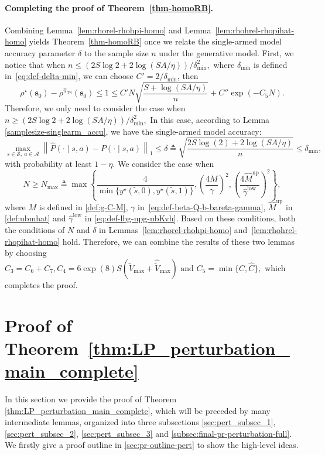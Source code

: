 \documentclass[mnsc,nonblindrev]{informs3}
\newcommand{\lbgmhat}{\widehat{\gamma}^{\mathrm{low}}}
\newcommand{\ubmhat}{\widehat{M}^{\mathrm{up}}}
\newcommand{\pihts}{\widehat{\pi}_{\mathrm{TS}}}
\newcommand{\bms}{\bm{s}}
\begin{document}
\paragraph{Completing the proof of Theorem~\ref{thm-homoRB}.}
Combining Lemma~\ref{lem:rhorel-rhohpi-homo} and Lemma~\ref{lem:rhohrel-rhopihat-homo} yields Theorem~\ref{thm-homoRB} once we relate the single-armed model accuracy parameter $\delta$ to the sample size $n$ under the generative model.
First, we notice that when
$n\le\left(2S\log2+2\log(SA/\eta)\right)/\delta_{\min}^2,
$
where $\delta_{\min}$ is defined in~\eqref{eq:def-delta-min}, we can choose $C'=2/\delta_{\min}$, then 
\[
    \rho^\star(\bms_0)-\rho^{\pihts}(\bms_0)\le 1\le C'N\sqrt{\frac{S + \log (SA/\eta)}{n}}+C''\exp(-C_5N).
\]
Therefore, we only need to consider the case when
$
n\ge\left(2S\log2+2\log(SA/\eta)\right)/\delta_{\min}^2,
$
In this case, according to Lemma \ref{samplesize-singlearm_accu}, we have the single-armed model accuracy:
\[
    \max_{s \in \mathcal{S},\ a \in \mathcal{A}} \left\| \widehat{P}(\cdot \mid s, a) - P(\cdot \mid s, a) \right\|_1 \le \delta\triangleq \sqrt{\frac{2S \log(2) + 2\log (SA/\eta)}{n}}\le\delta_{\min},
\]
with probability at least $1-\eta$. We consider the case when
\begin{equation}\label{eq:def-Nmax}
    N\ge N_{\max}\triangleq\max\left\{\frac{4}{\min\{y^\star(\tilde{s},0),y^\star(\tilde{s},1)\}},\left(\frac{4M}{\gamma}\right)^2,\left(\frac{4\ubmhat}{\lbgmhat}\right)^2\right\},
\end{equation}
where $M$ is defined in \eqref{def:g-C-M}, $\gamma$ in~\eqref{eq:def-beta-Q-b-bareta-gamma}, $\ubmhat$ in \eqref{def:ubmhat} and $\lbgmhat$ in \eqref{eq:def-lbg-upg-ubKvh}. Based on these conditions, both the conditions of $N$ and $\delta$ in Lemmas~\ref{lem:rhorel-rhohpi-homo} and~\ref{lem:rhohrel-rhopihat-homo} hold. Therefore, we can combine the results of these two lemmas by choosing 
$
    C_3=C_6+C_7,
    C_4=6\exp(8)S(\tilde{V}_{\max}+\widehat{\tilde{V}}_{\max})
    \text{ and }
    C_5=\min\{C,\widehat C\},
$               
which completes the proof.

\section{Proof of Theorem~\ref{thm:LP_perturbation_main_complete}}\label{sec:proof-lp-pa}

In this section we provide the proof of Theorem \ref{thm:LP_perturbation_main_complete}, which will be preceded by many intermediate lemmas, organized into three subsections \ref{sec:pert_subsec_1}, \ref{sec:pert_subsec_2}, \ref{sec:pert_subsec_3} and \ref{subsec:final-pr-perturbation-full}. We firstly give a proof outline in \ref{sec:pr-outline-pert} to show the high-level ideas.
\end{document}
